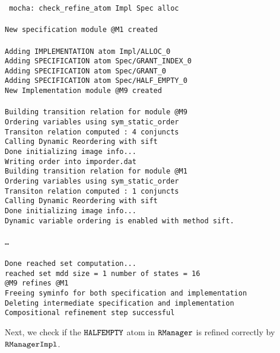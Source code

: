 \mypar
\noindent
{\tt
mocha: check\_refine\_atom  Impl Spec alloc \\
\\
New specification module @M1 created \\
\\
Adding IMPLEMENTATION atom Impl/ALLOC\_0 \\
Adding SPECIFICATION  atom Spec/GRANT\_INDEX\_0 \\
Adding SPECIFICATION  atom Spec/GRANT\_0 \\
Adding SPECIFICATION  atom Spec/HALF\_EMPTY\_0\\
New Implementation module @M9 created \\
\\
Building transition relation for module @M9 \\
Ordering variables using sym\_static\_order \\
Transiton relation computed : 4 conjuncts \\
Calling Dynamic Reordering with sift \\
Done initializing image info... \\
Writing order into imporder.dat \\
Building transition relation for module @M1 \\
Ordering variables using sym\_static\_order \\
Transiton relation computed : 1 conjuncts \\
Calling Dynamic Reordering with sift \\
Done initializing image info... \\
Dynamic variable ordering is enabled with method sift. \\
\\
\ldots\\
\\
Done reached set computation... \\
reached set mdd size =          1        number of states =       16 \\
@M9 refines @M1 \\
Freeing syminfo for both specification and implementation \\
Deleting intermediate specification and implementation \\
Compositional refinement step successful \\
}


\mypar
\noindent
Next, we check if the $\mbox{\tt HALFEMPTY}$ atom in $\mbox{\tt RManager}$ is
refined correctly by $\mbox{\tt RManagerImpl}$.

